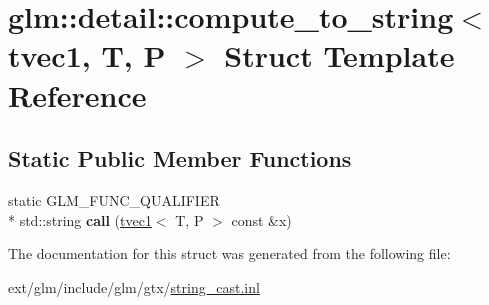 \hypertarget{structglm_1_1detail_1_1compute__to__string_3_01tvec1_00_01_t_00_01_p_01_4}{\section{glm\-:\-:detail\-:\-:compute\-\_\-to\-\_\-string$<$ tvec1, T, P $>$ Struct Template Reference}
\label{structglm_1_1detail_1_1compute__to__string_3_01tvec1_00_01_t_00_01_p_01_4}
}
\subsection*{Static Public Member Functions}
\begin{DoxyCompactItemize}
\item 
\hypertarget{structglm_1_1detail_1_1compute__to__string_3_01tvec1_00_01_t_00_01_p_01_4_ae459fc0d0afddfc2f977012f95210bd2}{static G\-L\-M\-\_\-\-F\-U\-N\-C\-\_\-\-Q\-U\-A\-L\-I\-F\-I\-E\-R \\*
std\-::string {\bfseries call} (\hyperlink{structglm_1_1tvec1}{tvec1}$<$ T, P $>$ const \&x)}\label{structglm_1_1detail_1_1compute__to__string_3_01tvec1_00_01_t_00_01_p_01_4_ae459fc0d0afddfc2f977012f95210bd2}

\end{DoxyCompactItemize}


The documentation for this struct was generated from the following file\-:\begin{DoxyCompactItemize}
\item 
ext/glm/include/glm/gtx/\hyperlink{string__cast_8inl}{string\-\_\-cast.\-inl}\end{DoxyCompactItemize}
